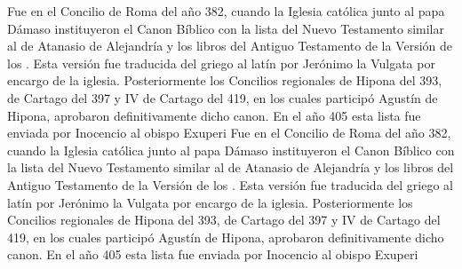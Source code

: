 \documentclass[a4paper,12pt]{article}
\begin{document}
Fue en el Concilio de Roma del año 382, cuando la Iglesia católica junto al papa Dámaso instituyeron el Canon Bíblico con la lista del Nuevo Testamento similar al de Atanasio de Alejandría y los libros del Antiguo Testamento de la Versión de los . Esta versión fue traducida del griego al latín por Jerónimo la Vulgata por encargo de la iglesia. Posteriormente los Concilios regionales de Hipona del 393,  de Cartago del 397 y IV de Cartago del 419, en los cuales participó Agustín de Hipona, aprobaron definitivamente dicho canon. En el año 405 esta lista fue enviada por Inocencio al obispo Exuperi
Fue en el Concilio de Roma del año 382, cuando la Iglesia católica junto al papa Dámaso instituyeron el Canon Bíblico con la lista del Nuevo Testamento similar al de Atanasio de Alejandría y los libros del Antiguo Testamento de la Versión de los . Esta versión fue traducida del griego al latín por Jerónimo la Vulgata por encargo de la iglesia. Posteriormente los Concilios regionales de Hipona del 393,  de Cartago del 397 y IV de Cartago del 419, en los cuales participó Agustín de Hipona, aprobaron definitivamente dicho canon. En el año 405 esta lista fue enviada por Inocencio al obispo Exuperi \cite{mascalchi_neuroimaging_2020}




  

 
\end{document}
